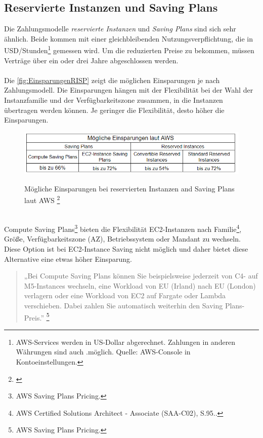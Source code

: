 \subsection{Reservierte Instanzen und Saving Plans}
Die Zahlungsmodelle \textit{reservierte Instanzen} und \textit{Saving Plans} sind sich sehr ähnlich. Beide kommen mit einer gleichbleibenden  Nutzungsverpflichtung, die in USD/Stunden\footnote{AWS-Services werden in US-Dollar abgerechnet. Zahlungen in anderen Währungen sind auch .möglich. Quelle: AWS-Console in Kontoeinstellungen.} gemessen wird. Um die reduzierten Preise  zu bekommen, müssen Verträge über ein oder drei Jahre abgeschlossen werden. 
\\\\
Die \autoref{fig:EinsparungenRISP} zeigt die möglichen Einsparungen je nach Zahlungsmodell. Die Einsparungen hängen mit der Flexibilität bei der Wahl der Instanzfamilie und der Verfügbarkeitszone zusammen, in die Instanzen übertragen werden können. Je geringer die Flexibilität, desto höher die Einsparungen.
\begin{figure}[h!]
  \centering
  \includegraphics[scale=0.8]{sources/EinsparungenRISP}\label{fig:EinsparungenRISP}\\
  \caption[Mögliche Einsparungen bei reservierten Instanzen and Saving Plans laut AWS]{}
  \label{fig:EinsparungenRISP}
  Mögliche Einsparungen bei reservierten Instanzen and Saving Plans laut AWS
  \footnote{\cite{AMZ07,AMZ11}}
\end{figure}
\\
Compute Saving Plans\footnote{AWS Saving Plans Pricing\cite{AMZ11}.} bieten die Flexibilität EC2-Instanzen nach Familie\footnote{AWS Certified Solutions Architect - Associate (SAA-C02), S.95.\cite{AWS1}.}, Größe, Verfügbarkeitszone (AZ), Betriebssystem oder Mandant zu wechseln. Diese Option ist bei EC2-Instance Saving nicht möglich und daher bietet diese Alternative eine etwas höher Einsparung.
\begin{quote}
    „Bei Compute Saving Plans können Sie beispielsweise jederzeit von C4- auf M5-Instances wechseln, eine Workload von EU (Irland) nach EU (London) verlagern oder eine Workload von EC2 auf Fargate oder Lambda verschieben. Dabei zahlen Sie automatisch weiterhin den Saving Plans-Preis.”
    \footnote{AWS Saving Plans Pricing\cite{AMZ11}.}
\end{quote}
